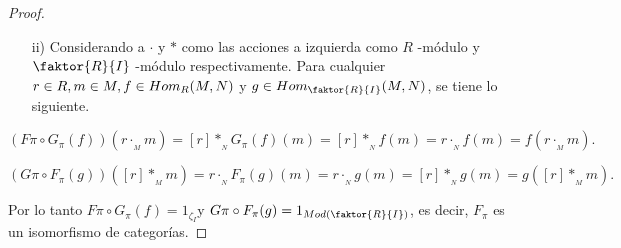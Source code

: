 \documentclass{article}
\begin{document}
\begin{enumerate}[label=\textbf{Ej \arabic*.}]
\begin{proof}
\begin{itemize}
				\item[ii)] Considerando a $\cdot$ y $*$ como las acciones a izquierda como $R$ -módulo y $\faktor{R}{I}$ -módulo respectivamente.
				Para cualquier $r\in R, m\in M,\\ f\in Hom_R(M,N)$ y $g\in Hom_{\faktor{R}{I}}(M,N)$, se tiene lo siguiente.
			\end{itemize}
			\[\left(F\pi\circ G_\pi(f)\right)(r\cdot_{{}_M}m)=[r] *_{{}_N} G_\pi(f)(m)=[r] *_{{}_N}f(m)=r\cdot_{{}_N}f(m)=f(r\cdot_{{}_M}m).\]
			
			\[\left(G\pi\circ F_\pi(g)\right)([r]*_{{}_M}m)=r \cdot_{{}_N} F_\pi(g)(m)=r\cdot_{{}_N}g(m)=[r]*_{{}_N}g(m)=g([r]*_{{}_M}m).\]
			
			Por lo tanto $F\pi\circ G_\pi(f)=1_{\zeta_I}$\quad y \quad $G\pi\circ F_\pi(g)=1_{Mod\left(\faktor{R}{I}\right)}$, es decir, $F_\pi$ es
			un isomorfismo de categorías.
		\end{proof}
		

\end{enumerate}
\end{document}
